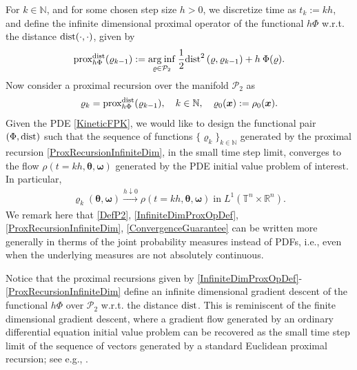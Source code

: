 \documentclass[10pt,twocolumn]{IEEEtran}
\begin{document}
For $k\in\mathbb{N}$, and for some chosen step size $h>0$, we discretize time as $t_{k} := kh$, and define the infinite dimensional proximal operator of the functional $h\Phi$ w.r.t. the distance ${\rm{dist}}(\cdot,\cdot)$, given by
\begin{eqnarray}
{\text{prox}}^{{\rm{dist}}}_{h\Phi}(\varrho_{k-1}) := \underset{\varrho\in\mathcal{P}_{2}} {{\rm{arg\:inf}}}\: \frac{1}{2} {\rm{dist}}^{2}\left(\varrho,\varrho_{k-1}\right) + h\: \Phi(\varrho).
\label{InfiniteDimProxOpDef}
\end{eqnarray}
Now consider a proximal recursion over the manifold $\mathcal{P}_{2}$ as
\begin{eqnarray}
\varrho_{k} = {\text{prox}}^{{\rm{dist}}}_{h\Phi}(\varrho_{k-1}), \quad k\in\mathbb{N}, \quad \varrho_{0}(\bm{x}) := \rho_{0}(\bm{x}).
\label{ProxRecursionInfiniteDim}	
\end{eqnarray}
Given the PDE \eqref{KineticFPK}, we would like to design the functional pair $\left(\Phi,{\rm{dist}}\right)$ such that the sequence of functions $\{\varrho_{k}\}_{k\in\mathbb{N}}$ generated by the proximal recursion \eqref{ProxRecursionInfiniteDim}, in the small time step limit, converges to the flow $\rho(t=kh,\bm{\theta},\bm{\omega})$ generated by the PDE initial value problem of interest. In particular,
\begin{align}
\varrho_{k}(\bm{\theta},\bm{\omega}) \xrightarrow{h\downarrow 0} \rho(t=kh,\bm{\theta},\bm{\omega}) \;\text{in}\;L^{1}\left(\mathbb{T}^{n} \times \mathbb{R}^{n}\right).
\label{ConvergenceGuarantee}	
\end{align}
We remark here that \eqref{DefP2}, \eqref{InfiniteDimProxOpDef}, \eqref{ProxRecursionInfiniteDim}, \eqref{ConvergenceGuarantee} can be written more generally in therms of the joint probability measures instead of PDFs, i.e., even when the underlying measures are not absolutely continuous.

Notice that the proximal recursions given by \eqref{InfiniteDimProxOpDef}-\eqref{ProxRecursionInfiniteDim} define an infinite dimensional gradient descent of the functional $h\Phi$ over $\mathcal{P}_{2}$ w.r.t. the distance ${\rm{dist}}$. This is reminiscent of the finite dimensional gradient descent, where a gradient flow generated by an ordinary differential equation initial value problem can be recovered as the small time step limit of the sequence of vectors generated by a standard Euclidean proximal recursion; see e.g., \cite[Sec. I]{caluya2019TAC}.
\end{document}
